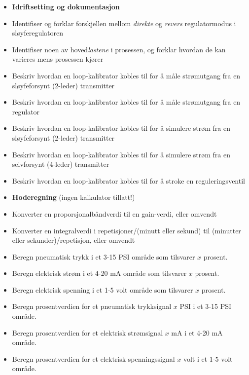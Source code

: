 \begin{itemize}
\item{} {\bf Idriftsetting og dokumentasjon}
\item{} Identifiser og forklar forskjellen mellom {\it direkte} og {\it revers} regulatormodus i sløyferegulatoren
\item{} Identifiser noen av hoved{\it lastene} i prosessen, og forklar hvordan de kan varieres mens prosessen kjører
\item{} Beskriv hvordan en loop-kalibrator kobles til for å måle strømutgang fra en sløyfeforsynt (2-leder) transmitter
\item{} Beskriv hvordan en loop-kalibrator kobles til for å måle strømutgang fra en regulator
\item{} Beskriv hvordan en loop-kalibrator kobles til for å simulere strøm fra en sløyfeforsynt (2-leder) transmitter
\item{} Beskriv hvordan en loop-kalibrator kobles til for å simulere strøm fra en selvforsynt (4-leder) transmitter
\item{} Beskriv hvordan en loop-kalibrator kobles til for å stroke en reguleringsventil
\end{itemize}

\filbreak

\begin{itemize}
\item{} {\bf Hoderegning} (ingen kalkulator tillatt!)
\item{} Konverter en proporsjonalbåndverdi til en gain-verdi, eller omvendt
\item{} Konverter en integralverdi i repetisjoner/(minutt eller sekund) til (minutter eller sekunder)/repetisjon, eller omvendt
\item{} Beregn pneumatisk trykk i et 3-15 PSI område som tilsvarer $x$ prosent.
\item{} Beregn elektrisk strøm i et 4-20 mA område som tilsvarer $x$ prosent.
\item{} Beregn elektrisk spenning i et 1-5 volt område som tilsvarer $x$ prosent.
\item{} Beregn prosentverdien for et pneumatisk trykksignal $x$ PSI i et 3-15 PSI område.
\item{} Beregn prosentverdien for et elektrisk strømsignal $x$ mA i et 4-20 mA område.
\item{} Beregn prosentverdien for et elektrisk spenningssignal $x$ volt i et 1-5 volt område.
\end{itemize}

